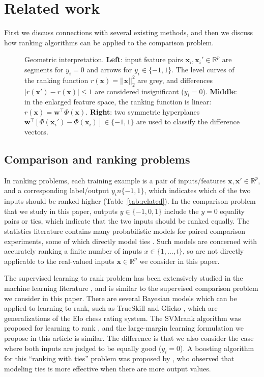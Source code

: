 \documentclass[twoside,11pt]{article}
\newcommand{\RR}{\mathbb R}
\begin{document}
\section{Related work}
\label{sec:related}

First we discuss connections with several existing methods, and then
we discuss how ranking algorithms can be applied to the comparison
problem.


\begin{figure}
  \centering
  
  \vskip -0.5cm
  \caption{Geometric interpretation. \textbf{Left}: input feature pairs
    $\mathbf x_i,\mathbf x_i'\in\RR^p$ are segments for $y_i=0$ and
    arrows for $y_i\in\{-1,1\}$. The level curves of the ranking
    function $r(\mathbf x)=||\mathbf x||_2^2$ are grey, and
    differences $|r(\mathbf x')-r(\mathbf x)|\leq 1$ are considered
    insignificant ($y_i=0$). \textbf{Middle}: in the enlarged feature
    space, the ranking function is linear: $r(\mathbf x)=\mathbf
    w^\intercal \Phi(\mathbf x)$. \textbf{Right}: two symmetric
    hyperplanes $\mathbf w^\intercal[\Phi(\mathbf x_i')-\Phi(\mathbf
    x_i)]\in\{-1,1\}$ are used to classify the difference vectors.}
  \label{fig:norm-data}
\end{figure}

\subsection{Comparison and ranking problems}

In ranking problems, each training example is a pair of
inputs/features $\mathbf x,\mathbf x'\in\RR^p$, and a corresponding
label/output $y_in\{-1,1\}$, which indicates which of the two inputs
should be ranked higher (Table~\ref{tab:related}). In the comparison
problem that we study in this paper, outputs $y\in\{-1,0,1\}$ include
the $y=0$ equality pairs or ties, which indicate that the two inputs
should be ranked equally.  The statistics literature contains many
probabilistic models for paired comparison experiments, some of which
directly model ties \citep{davidson-ties}. Such models are concerned
with accurately ranking a finite number of inputs $x\in\{1,\dots,t\}$,
so are not directly applicable to the real-valued inputs
$\mathbf x\in\RR^p$ we consider in this paper. 

The supervised learning to rank problem has been extensively studied
in the machine learning literature \citep{object-ranking-methods,
  learning-to-rank}, and is similar to the supervised comparison
problem we consider in this paper. There are several Bayesian models
which can be applied to learning to rank, such as TrueSkill
\citep{trueskill} and Glicko \citep{Glicko}, which are generalizations
of the Elo chess rating system. The SVMrank algorithm was
proposed for learning to rank \citep{ranksvm}, and the large-margin
learning formulation we propose in this article is similar. The
difference is that we also consider the case where both inputs are
judged to be equally good ($y_i=0$). A boosting algorithm for this
``ranking with ties'' problem was proposed by \citet{rank-with-ties},
who observed that modeling ties is more effective when there are more
output values.
\end{document}

